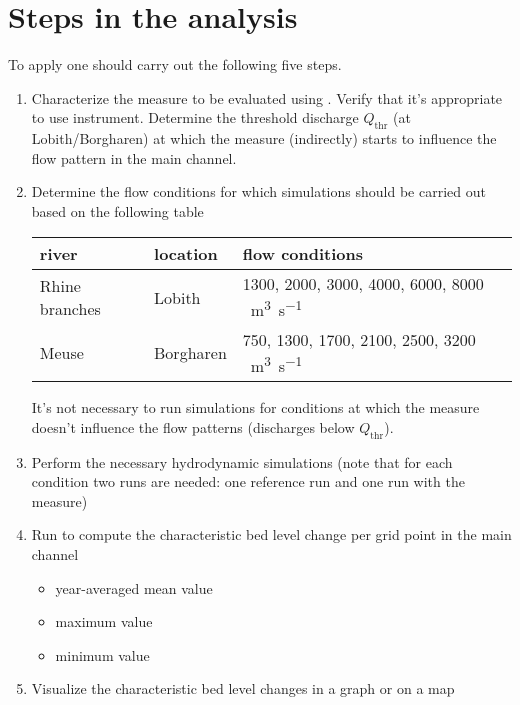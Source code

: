 \chapter{Steps in the analysis}\label{Chp:steps}

To apply \dfastmi one should carry out the following five steps.

\begin{enumerate}
\item Characterize the measure to be evaluated using \dfastmi.
Verify that it's appropriate to use \dfastmi instrument.
Determine the threshold discharge $Q_\text{thr}$ (at Lobith/Borgharen) at which the measure (indirectly) starts to influence the flow pattern in the main channel.

\item Determine the flow conditions for which \dflowfm simulations should be carried out based on the following table
\newline
\newline
\begin{tabular}{l|l|l}
river & location & flow conditions \\ \hline
Rhine branches & Lobith & 1300, 2000, 3000, 4000, 6000, 8000 \SI{}{\metre\cubed\per\second}\\
Meuse & Borgharen & 750, 1300, 1700, 2100, 2500, 3200 \SI{}{\metre\cubed\per\second}
\end{tabular}
\newline
\newline
It's not necessary to run simulations for conditions at which the measure doesn't influence the flow patterns (discharges below $Q_\text{thr}$).

\item Perform the necessary hydrodynamic simulations (note that for each condition two runs are needed: one reference run and one run with the measure)

\item Run \dfastmi to compute the characteristic bed level change per grid point in the main channel

\begin{itemize}
\item year-averaged mean value 
\item maximum value 
\item minimum value 
\end{itemize}

\item{Visualize the characteristic bed level changes in a graph or on a map}
\end{enumerate}

